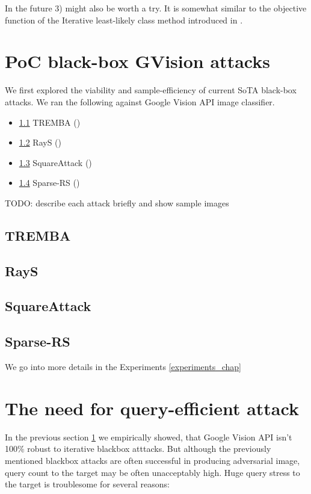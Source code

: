 In the future 3) might also be worth a try. It is somewhat similar to the objective function of the Iterative least-likely class method introduced in \cite{Kurakin2017AdversarialEI}.

\section{PoC black-box GVision attacks}
\label{poc_gvision_attacks}
We first explored the viability and sample-efficiency of current SoTA black-box attacks. We ran the following against Google Vision API image classifier.

\begin{itemize}
    \item \ref{tremba_poc} TREMBA (\cite{Huang2020BlackBoxAA})
    \item \ref{rays_poc} RayS (\cite{Chen2020RaySAR})
    \item \ref{square_poc} SquareAttack (\cite{Andriushchenko2020SquareAA})
    \item \ref{sparse_rs_poc} Sparse-RS (\cite{Croce2020SparseRSAV})
\end{itemize}

TODO: describe each attack briefly and show sample images

\subsection{TREMBA}
\label{tremba_poc}
\subsection{RayS}
\label{rays_poc}
\subsection{SquareAttack}
\label{square_poc}
\subsection{Sparse-RS}
\label{sparse_rs_poc}

We go into more details in the Experiments \ref{experiments_chap}


\section{The need for query-efficient attack}
\label{need_for_query_efficiency}
In the previous section \ref{poc_gvision_attacks} we empirically showed, that Google Vision API isn't 100\% robust to iterative blackbox atttacks. But although the previously mentioned blackbox attacks are often successful in producing adversarial image, query count to the target may be often unacceptably high. Huge query stress to the target is troublesome for several reasons:

